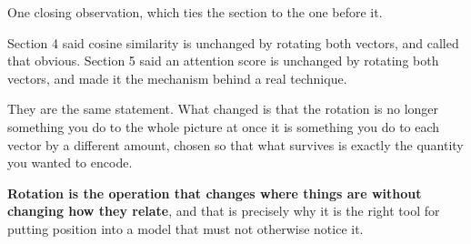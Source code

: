 \begin{fr}
One closing observation, which ties the section to the one before it.

Section 4 said cosine similarity is unchanged by rotating both vectors, and
called that obvious. Section 5 said an attention score is unchanged by rotating
both vectors, and made it the mechanism behind a real technique.

They are the same statement. What changed is that the rotation is no longer
something you do to the whole picture at once \dash{} it is something you do to
each vector by a different amount, chosen so that what survives is exactly the
quantity you wanted to encode.

\textbf{Rotation is the operation that changes where things are without
changing how they relate}, and that is precisely why it is the right tool for
putting position into a model that must not otherwise notice it.
\end{fr}

